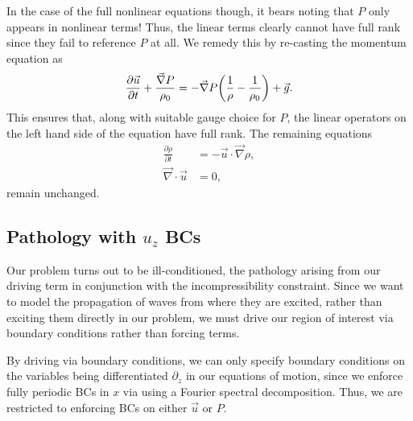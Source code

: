 \documentclass[11pt,
        usenames, %
        dvipsnames %
    ]{report}
\newcommand*{\pd}[2]{\frac{\partial#1}{\partial#2}}
\DeclarePairedDelimiter\p{\lparen}{\rparen}
\begin{document}
In the case of the full nonlinear equations though, it bears noting that $P$
only appears in nonlinear terms! Thus, the linear terms clearly cannot have full
rank since they fail to reference $P$ at all. We remedy this by re-casting the
momentum equation as
\begin{equation}
    \pd{\vec{u}}{t} + \frac{\vec{\nabla}P}{\rho_0}
        = -\vec{\nabla}P\p*{\frac{1}{\rho} - \frac{1}{\rho_0}}
            + \vec{g}.
\end{equation}
This ensures that, along with suitable gauge choice for $P$, the linear
operators on the left hand side of the equation have full rank. The remaining
equations
\begin{subequations}
    \begin{align}
        \pd{\rho}{t} &= -\vec{u} \cdot \vec{\nabla}\rho,\\
        \vec{\nabla} \cdot \vec{u} &= 0,
    \end{align}
\end{subequations}
remain unchanged.

\subsection{Pathology with $u_z$ BCs}

Our problem turns out to be ill-conditioned, the pathology arising from our
driving term in conjunction with the incompressibility constraint. Since we want
to model the propagation of waves from where they are excited, rather than
exciting them directly in our problem, we must drive our region of interest via
boundary conditions rather than forcing terms.

By driving via boundary conditions, we can only specify boundary conditions on
the variables being differentiated $\partial_z$ in our equations of motion,
since we enforce fully periodic BCs in $x$ via using a Fourier spectral
decomposition. Thus, we are restricted to enforcing BCs on either $\vec{u}$ or
$P$.
\end{document}

